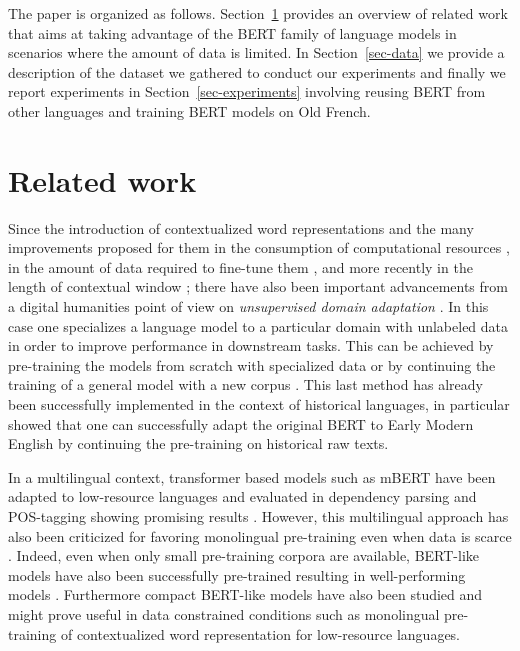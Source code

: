 The paper is organized as follows. Section~\ref{sec-related} provides an overview of related work that aims at taking advantage of the BERT family of language models in scenarios where the amount of data is limited. In Section~\ref{sec-data} we provide a description of the dataset we gathered to conduct our experiments and finally we report experiments in Section~\ref{sec-experiments} involving reusing BERT from other languages and training BERT models on Old French.

\section{Related work}
\label{sec-related}
Since the introduction of contextualized word representations \citep{peters-etal-2018-deep,akbik-etal-2018-contextual,devlin-etal-2019-bert} and the many improvements proposed for them in the consumption of computational resources \citep{clark-etal-2020-electra}, in the amount of data required to fine-tune them \citep{raffel-etal-2020-exploring}, and more recently in the length of contextual window \citep{xiong-etal-2021-nystromformer}; there have also been important advancements from a digital humanities point of view on \emph{unsupervised domain adaptation} \citep{ramponi-plank-2020-neural}. In this case one specializes a language model to a particular domain with unlabeled data in order to improve performance in downstream tasks. This can be achieved by  pre-training the models from scratch with specialized data \citep{beltagy-etal-2019-scibert} or by continuing the training of a general model with a new corpus \citep{lee-etal-2019-BioBERT, peng-etal-2019-transfer}. This last method has already been successfully implemented in the context of historical languages, in particular \citet{han-eisenstein-2019-unsupervised} showed that one can successfully adapt the original BERT \citep{devlin-etal-2019-bert} to Early Modern English by continuing the pre-training on historical raw texts.

In a multilingual context, transformer based models such as mBERT have been adapted to low-resource languages and evaluated in dependency parsing and POS-tagging showing promising results \citep{chau-etal-2020-parsing, muller-etal-2021-unseen, gururangan-etal-2020-dont, wang-etal-2020-extending}. However, this multilingual approach has also been criticized for favoring monolingual pre-training even when data is scarce \citep{virtanen-etal-2019-multilingual, ortiz-suarez-etal-2020-monolingual}. Indeed, even when only small pre-training corpora are available, BERT-like models have also been successfully pre-trained resulting in well-performing models \citep{micheli-etal-2020-importance}. Furthermore compact BERT-like models have also been studied \citep{turc-etal-2019-well} and might prove useful in data constrained conditions such as monolingual pre-training of contextualized word representation for low-resource languages.

